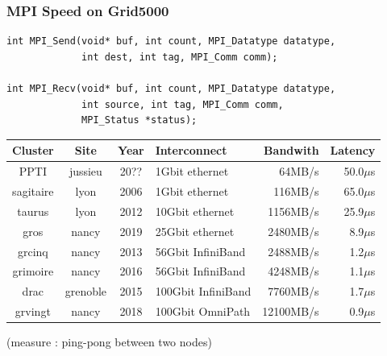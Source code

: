 \documentclass[xcolor={x11names,svgnames,psnames}]{beamer}
\begin{document}
\begin{frame}[fragile=singleslide]
\frametitle{MPI Speed on Grid5000}

\begin{verbatim}
int MPI_Send(void* buf, int count, MPI_Datatype datatype,
             int dest, int tag, MPI_Comm comm);

int MPI_Recv(void* buf, int count, MPI_Datatype datatype,
             int source, int tag, MPI_Comm comm,
             MPI_Status *status);
\end{verbatim}

\bigskip

\footnotesize 
\begin{tabular}{|c|c|c|l|r|r|}
  \hline
  Cluster & Site & Year & Interconnect & Bandwith & Latency \\
  \hline
  \hline
  PPTI      & jussieu & 20?? & \phantom{00}1Gbit ethernet &    64MB/s & 50.0$\mu$s \\
  sagitaire & lyon  & 2006 & \phantom{00}1Gbit ethernet   &   116MB/s & 65.0$\mu$s \\
  taurus    & lyon  & 2012 & \phantom{0}10Gbit ethernet   &  1156MB/s & 25.9$\mu$s\\
  gros      & nancy & 2019 & \phantom{0}25Gbit ethernet   &  2480MB/s & 8.9$\mu$s\\
  \hline
  grcinq    & nancy & 2013 & \phantom{0}56Gbit InfiniBand &  2488MB/s & 1.2$\mu$s \\
  grimoire  & nancy & 2016 & \phantom{0}56Gbit InfiniBand &  4248MB/s & 1.1$\mu$s\\
  drac      & grenoble & 2015 & 100Gbit InfiniBand        &  7760MB/s & 1.7$\mu$s \\
  \hline
  grvingt   & nancy & 2018 & 100Gbit OmniPath             & 12100MB/s & 0.9$\mu$s \\
  \hline
\end{tabular}


(measure : ping-pong between two nodes)
\end{frame}


\end{document}
